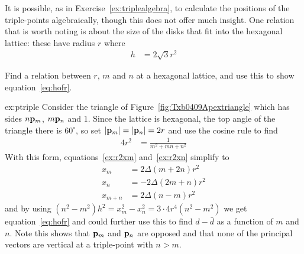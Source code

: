 It is possible, as in Exercise~\ref{ex:triplealgebra}, to calculate the positions of the triple-points algebraically, though this does not offer much insight.
One relation that is worth noting is about the size of the disks that fit into the hexagonal lattice: these 
have radius $r$ where
\begin{align}
	h &= 2\sqrt{3} r^2  \label{eq:hofr}
\end{align}
\begin{jExercise}\label{ex:ptriple} 
	\label{ex:triplealgebra}
	Find a relation between $r$, $m$ and $n$ at a hexagonal lattice, and use this to show equation~\eqref{eq:hofr}.
\end{jExercise}
\begin{jAnswer}{ex:ptriple}{
Consider the triangle of Figure~\ref{fig:Txb0409Apextriangle} which has sides $n{\mathbf p}_{m}$, $m{\mathbf p}_{n}$ and $1$. Since the lattice is hexagonal, the top angle of the triangle there is $60^\circ$, so set $|{\mathbf p}_{m}|=|{\mathbf p}_{n}|=2r$ and use the cosine rule to find   
\begin{align*}
	4 r^2  &=  \frac{1}{m^2+mn + n^2} \label{eq:cosine}
\end{align*}
With this form, equations~\eqref{ex:r2xm} and~\eqref{ex:r2xn} simplify to 
\begin{align*}
	x_m 
	&= 2\Delta(m+2n) r^2
	\\
	x_n &= -2 \Delta (2m+n) r^2
	\\
	x_{m+n} &=  2  \Delta(n-m) r^2
\end{align*}
and by using $(n^2-m^2)h^2=x^2_m-x^2_n=3\cdot 4 r^4 (n^2-m^2)$ we get equation~\eqref{eq:hofr} and could further use this to find $d-\bar{d}$ as a function of $m$ and $n$. Note this shows that ${\mathbf p}_{m}$ and ${\mathbf p}_{n}$ are opposed and that none of the principal vectors are vertical at a triple-point with $n>m$. 
}\end{jAnswer} 






